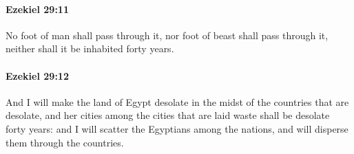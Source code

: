 		\paragraph{Ezekiel 29:11} %
			\label{EZEKIEL-29-11}

			No foot of man shall pass through it, nor foot of beast shall pass through it, neither shall it be inhabited forty years.


		\paragraph{Ezekiel 29:12} %
			\label{EZEKIEL-29-12}

			And I will make the land of Egypt desolate in the midst of the countries that are desolate, and her cities among the cities that are laid waste shall be desolate forty years: and I will scatter the Egyptians among the nations, and will disperse them through the countries.

